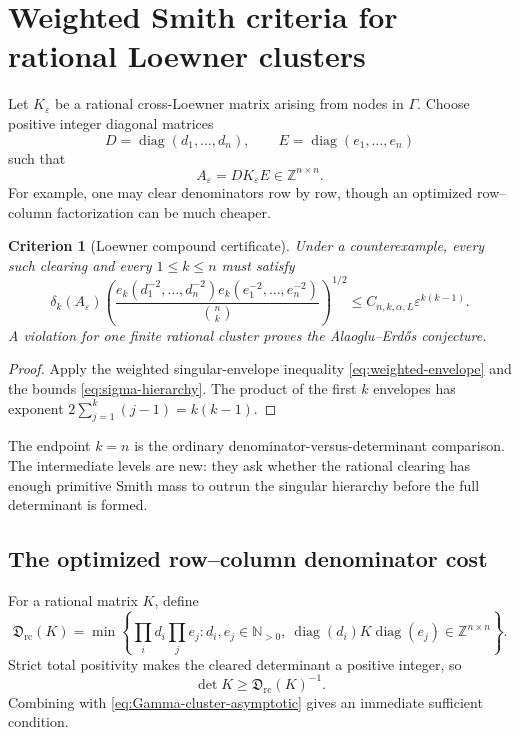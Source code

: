 \documentclass[11pt,oneside]{article}
\newtheorem{criterion}[theorem]{Criterion}
\theoremstyle{definition}
\theoremstyle{remark}
\newcommand{\AEconj}{Alaoglu--Erd\H{o}s}
\newcommand{\Z}{\mathbb{Z}}
\newcommand{\N}{\mathbb{N}}
\newcommand{\diag}{\operatorname{diag}}
\newcommand{\set}[1]{\left\{#1\right\}}
\newcommand{\eps}{\varepsilon}
\begin{document}
\section{Weighted Smith criteria for rational Loewner clusters}
\label{sec:loewner-smith}

Let $K_\eps$ be a rational cross-Loewner matrix arising from nodes in $\Gamma$.  Choose positive integer diagonal matrices
\[
 D=\diag(d_1,\dots,d_n),
 \qquad E=\diag(e_1,\dots,e_n)
\]
such that
\begin{equation}
 A_\eps=DK_\eps E\in\Z^{n\times n}.
 \label{eq:loewner-clearing}
\end{equation}
For example, one may clear denominators row by row, though an optimized row--column factorization can be much cheaper.

\begin{criterion}[Loewner compound certificate]
\label{crit:loewner-compound}
Under a counterexample, every such clearing and every $1\le k\le n$ must satisfy
\begin{equation}
 \boxed{
 \delta_k(A_\eps)
 \left(
 \frac{e_k(d_1^{-2},\dots,d_n^{-2})
       e_k(e_1^{-2},\dots,e_n^{-2})}
      {\binom nk}
 \right)^{1/2}
 \le C_{n,k,\alpha,L}\eps^{k(k-1)}.}
 \label{eq:loewner-compound-certificate}
\end{equation}
A violation for one finite rational cluster proves the \AEconj{} conjecture.
\end{criterion}

\begin{proof}
Apply the weighted singular-envelope inequality \eqref{eq:weighted-envelope} and the bounds \eqref{eq:sigma-hierarchy}.  The product of the first $k$ envelopes has exponent
$2\sum_{j=1}^k(j-1)=k(k-1)$.
\end{proof}

The endpoint $k=n$ is the ordinary denominator-versus-determinant comparison.  The intermediate levels are new: they ask whether the rational clearing has enough primitive Smith mass to outrun the singular hierarchy before the full determinant is formed.

\subsection{The optimized row--column denominator cost}

For a rational matrix $K$, define
\begin{equation}
 \mathfrak D_{\mathrm{rc}}(K)
 =\min\set{
  \prod_i d_i\prod_j e_j:
  d_i,e_j\in\N_{>0},\ \diag(d_i)K\diag(e_j)\in\Z^{n\times n}}.
 \label{eq:rc-cost}
\end{equation}
Strict total positivity makes the cleared determinant a positive integer, so
\begin{equation}
 \det K\ge\mathfrak D_{\mathrm{rc}}(K)^{-1}.
 \label{eq:rc-lower}
\end{equation}
Combining with \eqref{eq:Gamma-cluster-asymptotic} gives an immediate sufficient condition.
\end{document}
